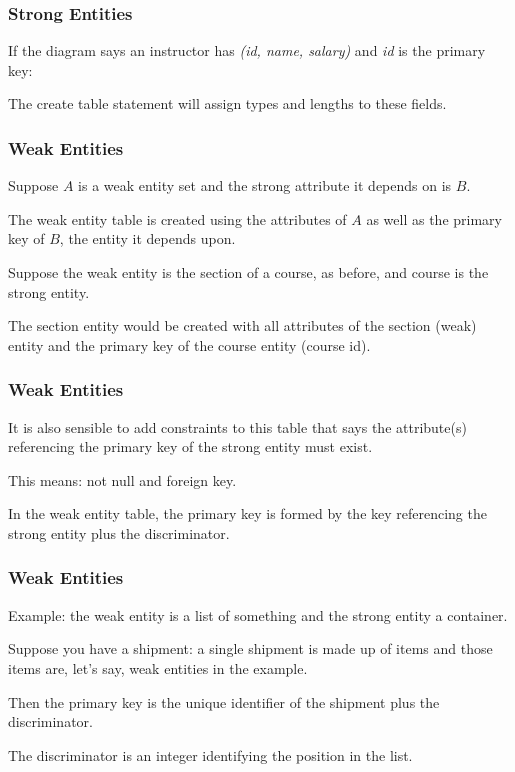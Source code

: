 \begin{frame}
\frametitle{Strong Entities}

If the diagram says an instructor has \textit{(id, name, salary)} and \textit{id} is the primary key:

The create table statement will assign types and lengths to these fields. 

\end{frame}



\begin{frame}
\frametitle{Weak Entities}

Suppose $A$ is a weak entity set and the strong attribute it depends on is $B$. 

The weak entity table is created using the attributes of $A$ as well as the primary key of $B$, the entity it depends upon. 

Suppose the weak entity is the section of a course, as before, and course is the strong entity. 

The section entity would be created with all attributes of the section (weak) entity and the primary key  of the course entity (course id).


\end{frame}




\begin{frame}
\frametitle{Weak Entities}

It is also sensible to add constraints to this table that says the attribute(s) referencing the primary key of the strong entity  must exist.

This means: not null and foreign key. 

In the weak entity table, the primary key is formed by the key referencing the strong entity plus the discriminator.

\end{frame}



\begin{frame}
\frametitle{Weak Entities}

Example: the weak entity is a list of something and the strong entity a container.

Suppose you have a shipment: a single shipment is made up of items and those items are, let's say, weak entities in the example. 

Then the primary key is the unique identifier of the shipment plus the discriminator. 

The discriminator is an integer identifying the position in the list. 


\end{frame}


